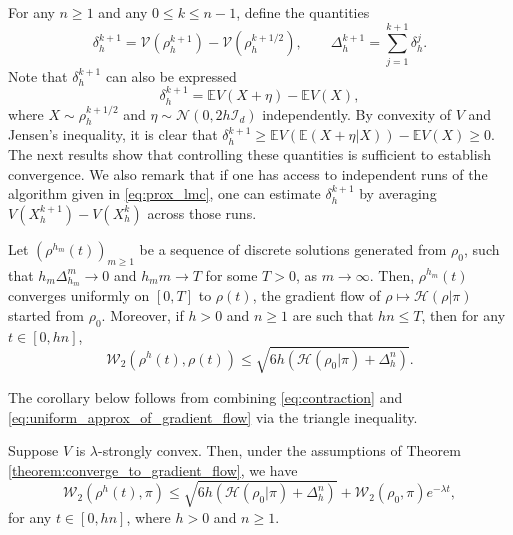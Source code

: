 \documentclass[final,12pt]{colt2018}
\newcommand{\was}{\mathcal{W}}
\begin{document}
For any $n \geq 1$ and any $0\leq k \leq n-1$, define the quantities
\begin{equation}
\delta_{h}^{k+1} = \mathcal{V}(\rho_{h}^{k+1}) -\mathcal{V}(\rho_{h}^{k+1/2}), \qquad \Delta_{h}^{k+1} = \sum_{j=1}^{k+1} \delta_{h}^{j}.
\end{equation}
Note that $\delta_{h}^{k+1}$ can also be expressed
\begin{equation}
\delta_{h}^{k+1} = \mathbb{E}V(X+\eta) - \mathbb{E}V(X),
\end{equation}
where $X\sim \rho_{h}^{k+1/2}$ and $\eta \sim \mathcal{N}(0,2h\mathcal{I}_d)$ independently. By convexity of $V$ and Jensen's inequality, it is clear that $\delta_{h}^{k+1} \geq \mathbb{E}V(\mathbb{E}(X+\eta | X)) - \mathbb{E}V(X) \geq 0$. The next results show that controlling these quantities is sufficient to establish convergence. We also remark that if one has access to independent runs of the algorithm given in \eqref{eq:prox_lmc}, one can estimate $\delta_{h}^{k+1}$ by averaging $V(X_h^{k+1}) - V(X_h^{k})$ across those runs.



\begin{theorem}\label{theorem:converge_to_gradient_flow}
Let $(\rho^{h_m}(t))_{m\geq1}$ be a sequence of discrete solutions generated from $\rho_0$, such that $h_m\Delta_{h_m}^m \to 0$ and $h_m m \to T$ for some $T >0$, as $m \to \infty$. Then, $\rho^{h_m}(t)$ converges uniformly on $[0,T]$ to $\rho(t)$, the gradient flow of $\rho\mapsto\mathcal{H}(\rho | \pi)$ started from $\rho_0$. Moreover, if $h >0$ and $n\geq 1$ are such that $hn \leq T$, then for any $t \in [0,hn]$, 
\begin{equation}\label{eq:uniform_approx_of_gradient_flow}
\was_2 (\rho^{h}(t), \rho(t)) \leq \sqrt{6h \left(\mathcal{H}(\rho_{0} | \pi) + \Delta_{h}^{n}\right)}.
\end{equation}
\end{theorem}

The corollary below follows from combining \eqref{eq:contraction} and \eqref{eq:uniform_approx_of_gradient_flow} via the triangle inequality.

\begin{corollary}\label{cor:convergence}
Suppose $V$ is $\lambda$-strongly convex. Then, under the assumptions of Theorem \ref{theorem:converge_to_gradient_flow}, we have
\begin{equation}
\was_2 (\rho^{h}(t),\pi) \leq \sqrt{6h \left(\mathcal{H}(\rho_{0} | \pi) + \Delta_{h}^{n}\right)} +  \was_2(\rho_0,\pi)e^{-\lambda t},
\end{equation}
for any $t \in [0,hn]$, where $h> 0$ and $n\geq 1$.
\end{corollary}
\end{document}
